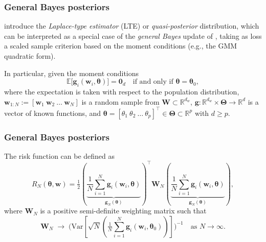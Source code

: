 \documentclass[12pt, compress]{beamer}
\begin{document}
\begin{frame}
	\frametitle{General Bayes posteriors}
\cite{chernozhukov2003mcmc} introduce the \emph{Laplace-type estimator} (LTE) or \textit{quasi-posterior} distribution, which can be interpreted as a special case of the \emph{general Bayes} update of \cite{bissiri2016general}, taking as loss a scaled sample criterion based on the moment conditions (e.g., the GMM quadratic form).

In particular, given the moment conditions
\[
\mathbb{E}\!\big[\mathbf{g}_i(\mathbf{w}_i,\boldsymbol{\theta})\big]=\mathbf{0}_{d} 
\quad \text{if and only if } \boldsymbol{\theta}=\boldsymbol{\theta}_0,
\]
where the expectation is taken with respect to the population distribution, 
$\mathbf{w}_{1:N}:=[\mathbf{w}_1 \ \mathbf{w}_2 \ \dots \ \mathbf{w}_N]$ is a random sample from $\mathbf{W}\subset \mathbb{R}^{d_w}$, 
$\mathbf{g}:\mathbb{R}^{d_w}\times\boldsymbol{\Theta}\to\mathbb{R}^{d}$ is a vector of known functions, and 
$\boldsymbol{\theta}=[\theta_{1}\ \theta_{2}\ \dots\ \theta_{p}]^{\top}\in\boldsymbol{\Theta}\subset\mathbb{R}^{p}$ with $d\geq p$. 
\end{frame}

\begin{frame}
	\frametitle{General Bayes posteriors}
The risk function can be defined as
\[
R_N(\boldsymbol{\theta},\mathbf{w})=\tfrac{1}{2}\left(\underbrace{\frac{1}{N}\sum_{i=1}^N \mathbf{g}_i(\mathbf{w}_i,\boldsymbol{\theta})}_{\mathbf{g}_N(\boldsymbol{\theta})}\right)^{\top}\mathbf{W}_N\left(\underbrace{\frac{1}{N}\sum_{i=1}^N\mathbf{g}_i(\mathbf{w}_i,\boldsymbol{\theta})}_{\mathbf{g}_N(\boldsymbol{\theta})}\right),
\]
where $\mathbf{W}_N$ is a positive semi-definite weighting matrix such that
\[
\mathbf{W}_N \;\to\; 
\Bigg(\text{Var}\left[\sqrt{N}\left(\tfrac{1}{N}\sum_{i=1}^N \mathbf{g}_i(\mathbf{w}_i,\boldsymbol{\theta}_0)\right)\right]\Bigg)^{-1}
\quad \text{as } N\rightarrow \infty.
\]  
\end{frame}
\end{document}
